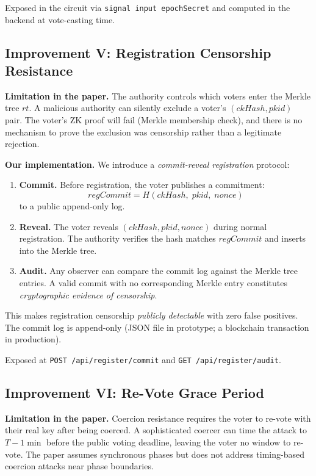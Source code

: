\documentclass[conference]{IEEEtran}
\begin{document}
Exposed in the circuit via \texttt{signal input epochSecret} and computed
in the backend at vote-casting time.

\subsection{Improvement V: Registration Censorship Resistance}

\textbf{Limitation in the paper.}
The authority controls which voters enter the Merkle tree $\mathit{rt}$.
A malicious authority can silently exclude a voter's $(ckHash, pkid)$ pair.
The voter's ZK proof will fail (Merkle membership check), and there is no
mechanism to prove the exclusion was censorship rather than a legitimate
rejection.

\textbf{Our implementation.}
We introduce a \emph{commit-reveal registration} protocol:
\begin{enumerate}
  \item \textbf{Commit.} Before registration, the voter publishes a commitment:
    \[
      \mathit{regCommit} = H(\mathit{ckHash},\; \mathit{pkid},\; \mathit{nonce})
    \]
    to a public append-only log.
  \item \textbf{Reveal.} The voter reveals $(\mathit{ckHash}, \mathit{pkid},
    \mathit{nonce})$ during normal registration.  The authority verifies
    the hash matches $\mathit{regCommit}$
    and inserts into the Merkle tree.
  \item \textbf{Audit.} Any observer can compare the commit log against
    the Merkle tree entries.  A valid commit with no corresponding Merkle
    entry constitutes \emph{cryptographic evidence of censorship}.
\end{enumerate}

This makes registration censorship \emph{publicly detectable} with zero
false positives.  The commit log is append-only (JSON file in prototype;
a blockchain transaction in production).

Exposed at \texttt{POST /api/register/commit} and \texttt{GET /api/register/audit}.

\subsection{Improvement VI: Re-Vote Grace Period}

\textbf{Limitation in the paper.}
Coercion resistance requires the voter to re-vote with their real key after
being coerced.  A sophisticated coercer can time the attack to $T - 1\min$
before the public voting deadline, leaving the voter no window to re-vote.
The paper assumes synchronous phases but does not address timing-based
coercion attacks near phase boundaries.
\end{document}
